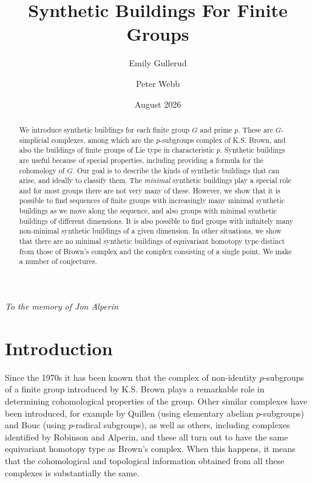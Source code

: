 \documentclass[12pt]{amsart}
\title{Synthetic Buildings For Finite Groups}
\author{Emily Gullerud}
\author{Peter Webb}
\date{August 2026}
\theoremstyle{plain}
\theoremstyle{definition}
\theoremstyle{remark}
\numberwithin{equation}{section}
\begin{document}
\begin{abstract}

We introduce synthetic buildings for each finite group $G$ and prime $p$. These are $G$-simplicial complexes, among which are the $p$-subgroups complex of K.S. Brown, and also the buildings of finite groups of Lie type in characteristic $p$. Synthetic buildings are useful because of special properties, including providing a formula for the cohomology of $G$. Our goal is to describe the kinds of synthetic buildings that can arise, and ideally to classify them. The \textit{minimal} synthetic buildings play a special role and for most groups there are not very many of these. However, we show that it is possible to find sequences of finite groups with increasingly many minimal synthetic buildings as we move along the sequence, and also groups with minimal synthetic buildings of different dimensions. It is also possible to find groups with infinitely many non-minimal synthetic buildings of a given dimension. In other situations, we show that there are no minimal synthetic buildings of equivariant homotopy type distinct from those of Brown's complex and the complex consisting of a single point. We make a number of conjectures. 

\end{abstract}
\maketitle
\centerline{\it To the memory of Jon Alperin}


\section{Introduction}

Since the 1970s it has been known that the complex of non-identity $p$-subgroups of a finite group introduced by K.S. Brown plays a remarkable role in determining cohomological properties of the group. Other similar complexes have been introduced, for example by Quillen (using elementary abelian $p$-subgroups) and Bouc (using $p$-radical subgroups), as well as others, including complexes identified by Robinson and Alperin, and these all turn out to have the same equivariant homotopy type as Brown's complex. When this happens, it means that the cohomological and topological information obtained from all these complexes is substantially the same.
\end{document}
